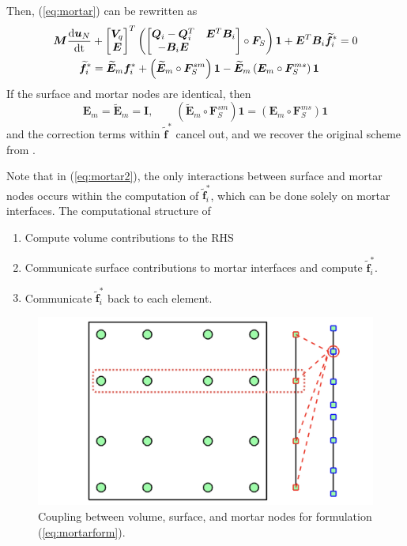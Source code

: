 \documentclass{svjour3}                     %
\renewcommand{\tilde}{\widetilde}
\newcommand{\td}[2]{\frac{{\rm d}#1}{{\rm d}{\rm #2}}}
\newcommand{\LRp}[1]{\left( #1 \right)}
\begin{document}
Then, (\ref{eq:mortar}) can be rewritten as 
\begin{align}
\bm{M}\td{\bm{u}_N}{t} &+ 
\begin{bmatrix} \bm{V}_q \\ \bm{E} \end{bmatrix}^T
\LRp{\begin{bmatrix}
\bm{Q}_i-\bm{Q}_i^T & \bm{E}^T\bm{B}_i\\
-\bm{B}_i\bm{E} & \\
\end{bmatrix} \circ \bm{F}_S}\bm{1} + \bm{E}^T\bm{B}_i \tilde{\bm{f}}^*_i = 0 \label{eq:mortarform}\\
\tilde{\bm{f}}^*_i &= \tilde{\bm{E}}_m\bm{f}^*_i + \LRp{\tilde{\bm{E}}_m\circ \bm{F}_S^{sm}}\bm{1} - \tilde{\bm{E}}_m \LRp{ \bm{E}_m \circ \bm{F}_S^{ms}}\bm{1} 
\nonumber
\end{align}
If the surface and mortar nodes are identical, then 
\[
\bm{E}_m = \tilde{\bm{E}}_m = \bm{I}, \qquad \LRp{\tilde{\bm{E}}_m \circ \bm{F}_S^{sm}}\bm{1} = \LRp{ \bm{E}_m \circ \bm{F}_S^{ms}}\bm{1}
\]
and the correction terms within $\tilde{\bm{f}}^*$ cancel out, and we recover the original scheme from \cite{chan2017discretely}.

Note that in (\ref{eq:mortar2}), the only interactions between surface and mortar nodes occurs within the computation of $\tilde{\bm{f}}^*_i$, which can be done solely on mortar interfaces.  The computational structure of 
\begin{enumerate}
\item Compute volume contributions to the RHS
\item Communicate surface contributions to mortar interfaces and compute $\tilde{\bm{f}}^*_i$.
\item Communicate $\tilde{\bm{f}}^*_i$ back to each element.  
\end{enumerate}

\begin{figure}
\centering
\includegraphics[width=.55\textwidth]{mortar_coupling.png}
\caption{Coupling between volume, surface, and mortar nodes for formulation (\ref{eq:mortarform}).}
\end{figure}
\end{document}
